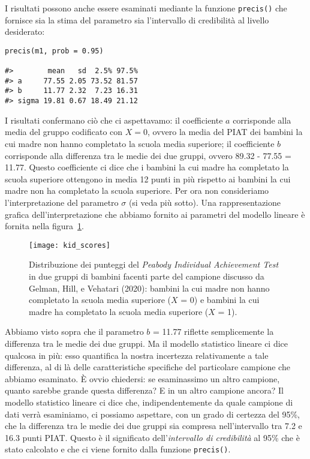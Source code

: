 I risultati possono anche essere esaminati mediante la funzione \verb+precis()+ che fornisce sia la stima del parametro sia l'intervallo di credibilità al livello desiderato:




\begin{lstlisting}
precis(m1, prob = 0.95)

#>        mean   sd  2.5% 97.5%
#> a     77.55 2.05 73.52 81.57
#> b     11.77 2.32  7.23 16.31
#> sigma 19.81 0.67 18.49 21.12
\end{lstlisting}
 


I risultati confermano ciò che ci aspettavamo: il coefficiente $a$ corrisponde alla media del gruppo codificato con $X = 0$, ovvero la media del PIAT dei bambini la cui madre non hanno completato la scuola media superiore; il coefficiente $b$ corrisponde alla differenza tra le medie dei due gruppi, ovvero 89.32 - 77.55 = 11.77.
Questo coefficiente ci dice che i bambini la cui madre ha completato la scuola superiore ottengono in media 12 punti in più rispetto ai bambini la cui madre non ha completato la scuola superiore.
Per ora non consideriamo l'interpretazione del parametro $\sigma$ (si veda più sotto).
Una rappresentazione grafica dell'interpretazione che abbiamo fornito ai parametri del modello lineare è fornita nella figura~\ref{fig:kid_scores}.

\begin{figure} %
 \centering
 \texttt{[image: kid\_scores]}
 \caption{Distribuzione dei punteggi del \emph{Peabody Individual Achievement Test} in due gruppi di bambini facenti parte del campione discusso da Gelman, Hill, e Vehatari (2020): bambini la cui madre non hanno completato la scuola media superiore ($X$ = 0) e bambini la cui madre ha completato la scuola media superiore ($X$ = 1). 
}
\label{fig:kid_scores}
\end{figure}

Abbiamo visto sopra che il parametro $b$ = 11.77 riflette semplicemente la differenza tra le medie dei due gruppi.
Ma il modello statistico lineare ci dice qualcosa in più: esso quantifica la nostra incertezza relativamente a tale differenza, al di là delle caratteristiche specifiche del particolare campione che abbiamo esaminato. 
È ovvio chiedersi: se esaminassimo un altro campione, quanto sarebbe grande questa differenza?
E in un altro campione ancora?
Il modello statistico lineare ci dice che, indipendentemente da quale campione di dati verrà esaminiamo, ci possiamo aspettare, con un grado di certezza del 95\%, che la differenza tra le medie dei due gruppi sia compresa nell'intervallo tra 7.2 e 16.3 punti PIAT.
Questo è il significato dell'\emph{intervallo di credibilità} al 95\% che è stato calcolato e che ci viene fornito dalla funzione \verb+precis()+.

